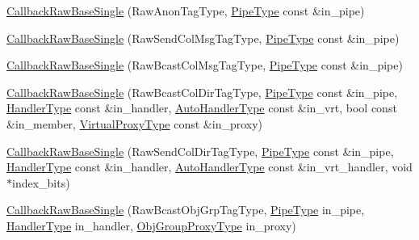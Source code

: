 \begin{DoxyCompactItemize}
\item 
\hyperlink{structvt_1_1pipe_1_1callback_1_1cbunion_1_1_callback_raw_base_single_a2586495207c03c2fb5247e19ee189984}{Callback\+Raw\+Base\+Single} (Raw\+Anon\+Tag\+Type, \hyperlink{namespacevt_ac9852acda74d1896f48f406cd72c7bd3}{Pipe\+Type} const \&in\+\_\+pipe)
\item 
\hyperlink{structvt_1_1pipe_1_1callback_1_1cbunion_1_1_callback_raw_base_single_ada70fbd67b17be3a4eb86fd497b2c409}{Callback\+Raw\+Base\+Single} (Raw\+Send\+Col\+Msg\+Tag\+Type, \hyperlink{namespacevt_ac9852acda74d1896f48f406cd72c7bd3}{Pipe\+Type} const \&in\+\_\+pipe)
\item 
\hyperlink{structvt_1_1pipe_1_1callback_1_1cbunion_1_1_callback_raw_base_single_a1bdc68ca7ce795dc6acbc0b42a97216f}{Callback\+Raw\+Base\+Single} (Raw\+Bcast\+Col\+Msg\+Tag\+Type, \hyperlink{namespacevt_ac9852acda74d1896f48f406cd72c7bd3}{Pipe\+Type} const \&in\+\_\+pipe)
\item 
\hyperlink{structvt_1_1pipe_1_1callback_1_1cbunion_1_1_callback_raw_base_single_aef47cd7027159c0cb7c5910455b0530c}{Callback\+Raw\+Base\+Single} (Raw\+Bcast\+Col\+Dir\+Tag\+Type, \hyperlink{namespacevt_ac9852acda74d1896f48f406cd72c7bd3}{Pipe\+Type} const \&in\+\_\+pipe, \hyperlink{namespacevt_af64846b57dfcaf104da3ef6967917573}{Handler\+Type} const \&in\+\_\+handler, \hyperlink{structvt_1_1pipe_1_1callback_1_1cbunion_1_1_callback_raw_base_single_a734a9c83099de5bc1cd85f9da8dba7bb}{Auto\+Handler\+Type} const \&in\+\_\+vrt, bool const \&in\+\_\+member, \hyperlink{namespacevt_a1b417dd5d684f045bb58a0ede70045ac}{Virtual\+Proxy\+Type} const \&in\+\_\+proxy)
\item 
\hyperlink{structvt_1_1pipe_1_1callback_1_1cbunion_1_1_callback_raw_base_single_af249d8dc02e5b50697f33c35718a8c40}{Callback\+Raw\+Base\+Single} (Raw\+Send\+Col\+Dir\+Tag\+Type, \hyperlink{namespacevt_ac9852acda74d1896f48f406cd72c7bd3}{Pipe\+Type} const \&in\+\_\+pipe, \hyperlink{namespacevt_af64846b57dfcaf104da3ef6967917573}{Handler\+Type} const \&in\+\_\+handler, \hyperlink{structvt_1_1pipe_1_1callback_1_1cbunion_1_1_callback_raw_base_single_a734a9c83099de5bc1cd85f9da8dba7bb}{Auto\+Handler\+Type} const \&in\+\_\+vrt\+\_\+handler, void $\ast$index\+\_\+bits)
\item 
\hyperlink{structvt_1_1pipe_1_1callback_1_1cbunion_1_1_callback_raw_base_single_a2ff2eebe15a6b270473f61cfa2a9804a}{Callback\+Raw\+Base\+Single} (Raw\+Bcast\+Obj\+Grp\+Tag\+Type, \hyperlink{namespacevt_ac9852acda74d1896f48f406cd72c7bd3}{Pipe\+Type} in\+\_\+pipe, \hyperlink{namespacevt_af64846b57dfcaf104da3ef6967917573}{Handler\+Type} in\+\_\+handler, \hyperlink{namespacevt_ad7cae989df485fccca57f0792a880a8e}{Obj\+Group\+Proxy\+Type} in\+\_\+proxy)

\end{DoxyCompactItemize}
